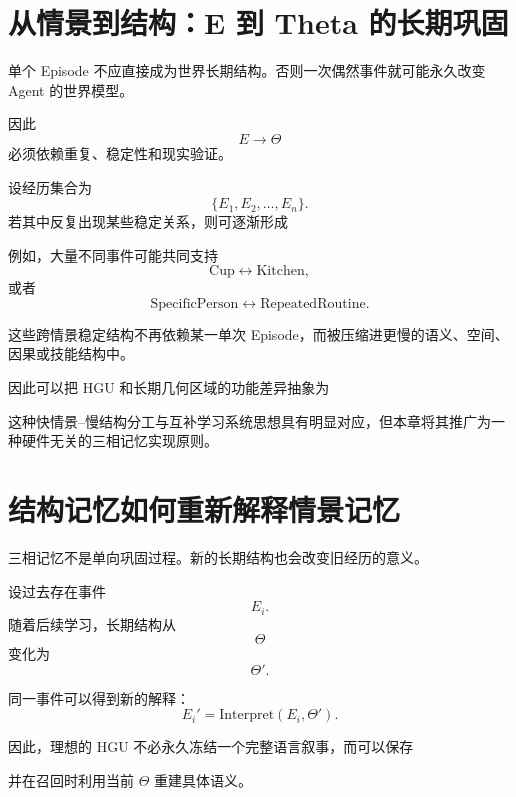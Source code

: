 \section{从情景到结构：E 到 Theta 的长期巩固}

单个 Episode 不应直接成为世界长期结构。否则一次偶然事件就可能永久改变 Agent 的世界模型。

因此
\[
E\rightarrow\Theta
\]
必须依赖重复、稳定性和现实验证。

设经历集合为
\[
\{E_1,E_2,\ldots,E_n\}.
\]
若其中反复出现某些稳定关系，则可逐渐形成
\begin{statementbox}
\centering
{}
\end{statementbox}

例如，大量不同事件可能共同支持
\[
\mathrm{Cup}
\leftrightarrow
\mathrm{Kitchen},
\]
或者
\[
\mathrm{SpecificPerson}
\leftrightarrow
\mathrm{RepeatedRoutine}.
\]

这些跨情景稳定结构不再依赖某一单次 Episode，而被压缩进更慢的语义、空间、因果或技能结构中。

因此可以把 HGU 和长期几何区域的功能差异抽象为
\begin{statementbox}
\centering
{}
\end{statementbox}
\begin{statementbox}
\centering
{}
\end{statementbox}

这种快情景--慢结构分工与互补学习系统思想具有明显对应，但本章将其推广为一种硬件无关的三相记忆实现原则。

\section{结构记忆如何重新解释情景记忆}

三相记忆不是单向巩固过程。新的长期结构也会改变旧经历的意义。

设过去存在事件
\[
E_i.
\]
随着后续学习，长期结构从
\[
\Theta
\]
变化为
\[
\Theta'.
\]

同一事件可以得到新的解释：
\[
\boxed{
E_i'
=
\mathrm{Interpret}(E_i,\Theta').
}
\]

因此，理想的 HGU 不必永久冻结一个完整语言叙事，而可以保存
\begin{statementbox}
\centering
{}
\end{statementbox}
并在召回时利用当前 $\Theta$ 重建具体语义。

